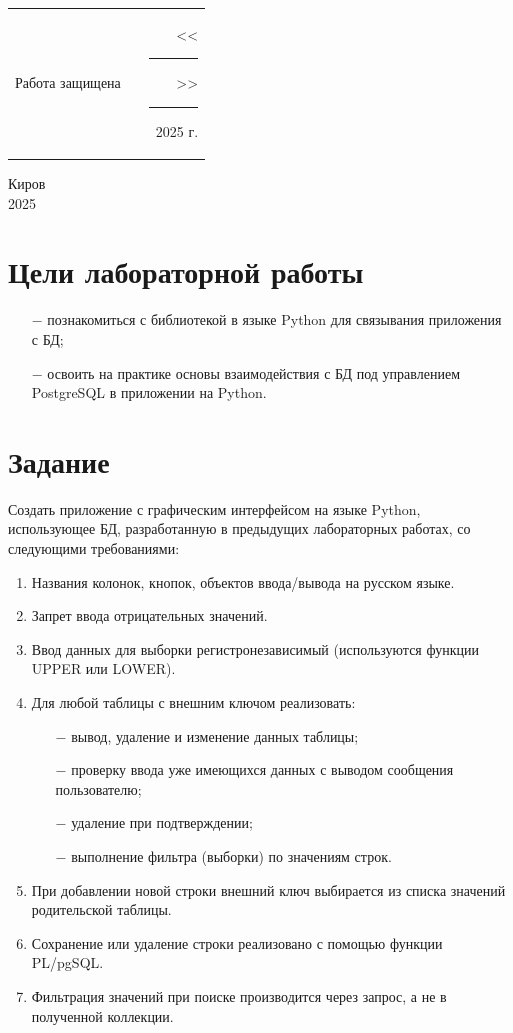 \documentclass[oneside,a4paper,14pt]{extarticle}
\begin{document}
\noindent
\begin{tabular}{lp{58mm}r}
  Работа защищена &  & \hspace{13mm}<<\rule[-1mm]{5mm}{0.10mm}\/>>\rule[-1mm]{30mm}{0.10mm}\ 2025 г.
\end{tabular}
\vfill

\begin{center}
  Киров\\
  2025
\end{center}

\newpage\thispagestyle{plain}

\section*{Цели лабораторной работы}
\begin{itemize}
  \item[$-$] познакомиться с библиотекой в языке Python для связывания приложения с БД;
  \item[$-$] освоить на практике основы взаимодействия с БД под управлением PostgreSQL в приложении на Python.
\end{itemize}

\section*{Задание}
Создать приложение с графическим интерфейсом на языке Python, использующее БД, разработанную в предыдущих лабораторных работах, со следующими требованиями:
\begin{enumerate}
  \item Названия колонок, кнопок, объектов ввода/вывода на русском языке.
  \item Запрет ввода отрицательных значений.
  \item Ввод данных для выборки регистронезависимый (используются функции UPPER или LOWER).
  \item Для любой таблицы с внешним ключом реализовать:
  \begin{itemize}
    \item[$-$] вывод, удаление и изменение данных таблицы;
    \item[$-$] проверку ввода уже имеющихся данных с выводом сообщения пользователю;
    \item[$-$] удаление при подтверждении;
    \item[$-$] выполнение фильтра (выборки) по значениям строк.
  \end{itemize}
  \item При добавлении новой строки внешний ключ выбирается из списка значений родительской таблицы.
  \item Сохранение или удаление строки реализовано с помощью функции PL/pgSQL.
  \item Фильтрация значений при поиске производится через запрос, а не в полученной коллекции.
\end{enumerate}
\end{document}
